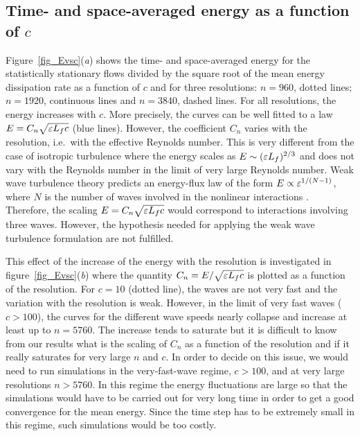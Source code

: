 \subsection{Time- and space-averaged energy as a function of $c$}




Figure~\ref{fig_Evsc}(\textit{a}) shows the time- and space-averaged
energy for the statistically stationary flows divided by the square
root of the mean energy dissipation rate as a function of $c$ and for
three resolutions: $n = 960$, dotted lines; $n = 1920$, continuous
lines and $n = 3840$, dashed lines.
%
For all resolutions, the energy increases with $c$.  More precisely,
the curves can be well fitted to a law $E = C_n \sqrt{\varepsilon L_f c}$
(blue lines).  However, the coefficient $C_n$ varies with the
resolution, i.e.\ with the effective Reynolds number.
%
This is very different from the case of isotropic turbulence where the
energy scales as $E \sim (\varepsilon L_f)^{2/3}$ and does not vary with the
Reynolds number in the limit of very large Reynolds number.
%
Weak wave turbulence theory predicts an energy-flux law of the form $E
\propto \varepsilon^{1/(N-1)}$, where $N$ is the number of waves involved
in the nonlinear interactions \cite[]{Nazarenko2011}.  Therefore, the
scaling $E = C_n \sqrt{\varepsilon L_f c}$ would correspond to interactions
involving three waves.
%
However, the hypothesis needed for applying the weak wave turbulence
formulation are not fulfilled.


This effect of the increase of the energy with the resolution is
investigated in figure~\ref{fig_Evsc}(\textit{b}) where the quantity
$C_n = E/\sqrt{\varepsilon L_f c}$ is plotted as a function of the
resolution.
%
For $c = 10$ (dotted line), the waves are not very fast and the
variation with the resolution is weak.
%
However, in the limit of very fast waves ($c>100$), the curves for the
different wave speeds nearly collapse and increase at least up to $n =
5760$.  The increase tends to saturate but it is difficult to know
from our results what is the scaling of $C_n$ as a function of the
resolution and if it really saturates for very large $n$ and $c$.
%
In order to decide on this issue, we would need to run simulations in
the very-fast-wave regime, $c>100$, and at very large resolutions $n >
5760$.  In this regime the energy fluctuations are large so
that the simulations would have to be carried out for very long time
in order to get a good convergence for the mean energy.  Since the
time step has to be extremely small in this regime, such simulations
would be too costly.








